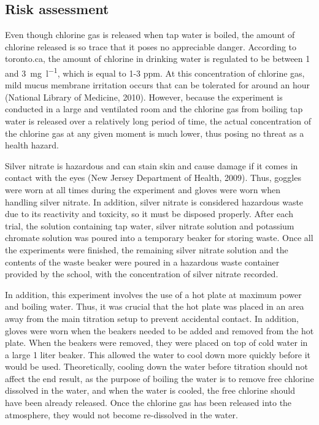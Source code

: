 \documentclass[11pt]{article}
\begin{document}
\subsection{Risk assessment}

Even though chlorine gas is released when tap water is boiled, the amount of chlorine released is so trace that it poses no appreciable danger. According to toronto.ca, the amount of chlorine in drinking water is regulated to be between 1 and \SI{3}{\mg\per\litre}, which is equal to 1-3 ppm. At this concentration of chlorine gas, mild mucus membrane irritation occurs that can be tolerated for around an hour (National Library of Medicine, 2010). However, because the experiment is conducted in a large and ventilated room and the chlorine gas from boiling tap water is released over a relatively long period of time, the actual concentration of the chlorine gas at any given moment is much lower, thus posing no threat as a health hazard.

Silver nitrate is hazardous and can stain skin and cause damage if it comes in contact with the eyes (New Jersey Department of Health, 2009). Thus, goggles were worn at all times during the experiment and gloves were worn when handling silver nitrate. In addition, silver nitrate is considered hazardous waste due to its reactivity and toxicity, so it must be disposed properly. After each trial, the solution containing tap water, silver nitrate solution and potassium chromate solution was poured into a temporary beaker for storing waste. Once all the experiments were finished, the remaining silver nitrate solution and the contents of the waste beaker were poured in a hazardous waste container provided by the school, with the concentration of silver nitrate recorded.

In addition, this experiment involves the use of a hot plate at maximum power and boiling water. Thus, it was crucial that the hot plate was placed in an area away from the main titration setup to prevent accidental contact. In addition, gloves were worn when the beakers needed to be added and removed from the hot plate. When the beakers were removed, they were placed on top of cold water in a large 1 liter beaker. This allowed the water to cool down more quickly before it would be used. Theoretically, cooling down the water before titration should not affect the end result, as the purpose of boiling the water is to remove free chlorine dissolved in the water, and when the water is cooled, the free chlorine should have been already released. Once the chlorine gas has been released into the atmosphere, they would not become re-dissolved in the water.
\end{document}
